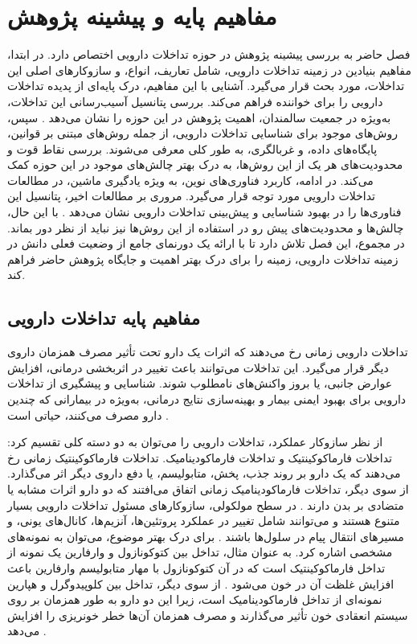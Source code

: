 \chapter{مفاهیم پایه و پیشینه پژوهش}


فصل حاضر به بررسی پیشینه پژوهش در حوزه تداخلات دارویی اختصاص دارد. در ابتدا، مفاهیم بنیادین در زمینه تداخلات دارویی، شامل تعاریف، انواع، و سازوکار‌های اصلی این تداخلات، مورد بحث قرار می‌گیرد. آشنایی با این مفاهیم، درک پایه‌ای از پدیده تداخلات دارویی را برای خواننده فراهم می‌کند. بررسی پتانسیل آسیب‌رسانی این تداخلات، به‌ویژه در جمعیت سالمندان، اهمیت پژوهش در این حوزه را نشان می‌دهد \cite{ref_hines2011}. سپس، روش‌های موجود برای شناسایی تداخلات دارویی، از جمله روش‌های مبتنی بر قوانین، پایگاه‌های داده، و غربالگری، به طور کلی معرفی می‌شوند. بررسی نقاط قوت و محدودیت‌های هر یک از این روش‌ها، به درک بهتر چالش‌های موجود در این حوزه کمک می‌کند. در ادامه، کاربرد فناوری‌های نوین، به ویژه یادگیری ماشین، در مطالعات تداخلات دارویی مورد توجه قرار می‌گیرد. مروری بر مطالعات اخیر، پتانسیل این فناوری‌ها را در بهبود شناسایی و پیش‌بینی تداخلات دارویی نشان می‌دهد \cite{ref_ryu2018, ref_li2023, ref_nyamabo2021}. با این حال، چالش‌ها و محدودیت‌های پیش رو در استفاده از این روش‌ها نیز نباید از نظر دور بماند. در مجموع، این فصل تلاش دارد تا با ارائه یک دورنمای جامع از وضعیت فعلی دانش در زمینه تداخلات دارویی، زمینه را برای درک بهتر اهمیت و جایگاه پژوهش حاضر فراهم کند.

\section{مفاهیم پایه تداخلات دارویی}

تداخلات دارویی زمانی رخ می‌دهند که اثرات یک دارو تحت تأثیر مصرف همزمان داروی دیگر قرار می‌گیرد. این تداخلات می‌توانند باعث تغییر در اثربخشی درمانی، افزایش عوارض جانبی، یا بروز واکنش‌های نامطلوب شوند. شناسایی و پیشگیری از تداخلات دارویی برای بهبود ایمنی بیمار و بهینه‌سازی نتایج درمانی، به‌ویژه در بیمارانی که چندین دارو مصرف می‌کنند، حیاتی است \cite{ref_hines2011}. 

از نظر سازوکار عملکرد، تداخلات دارویی را می‌توان به دو دسته کلی تقسیم کرد: تداخلات فارماکوکینتیک و تداخلات فارماکودینامیک. تداخلات فارماکوکینتیک زمانی رخ می‌دهند که یک دارو بر روند جذب، پخش، متابولیسم، یا دفع داروی دیگر اثر می‌گذارد. از سوی دیگر، تداخلات فارماکودینامیک زمانی اتفاق می‌افتند که دو دارو اثرات مشابه یا متضادی بر بدن دارند \cite{ref_ryu2018}. در سطح مولکولی، سازوکار‌های مسئول تداخلات دارویی بسیار متنوع هستند و می‌توانند شامل تغییر در عملکرد پروتئین‌ها، آنزیم‌ها، کانال‌های یونی، و مسیرهای انتقال پیام در سلول‌ها باشند \cite{ref_he2023}. برای درک بهتر موضوع، می‌توان به نمونه‌های مشخصی اشاره کرد. به عنوان مثال، تداخل بین کتوکونازول و وارفارین یک نمونه از تداخل فارماکوکینتیک است که در آن کتوکونازول با مهار متابولیسم وارفارین باعث افزایش غلظت آن در خون می‌شود \cite{ref_cascorbi2012}. از سوی دیگر، تداخل بین کلوپیدوگرل و هپارین نمونه‌ای از تداخل فارماکودینامیک است، زیرا این دو دارو به طور همزمان بر روی سیستم انعقادی خون تأثیر می‌گذارند و مصرف همزمان آن‌ها خطر خونریزی را افزایش می‌دهد  \cite{ref_hines2011}.

